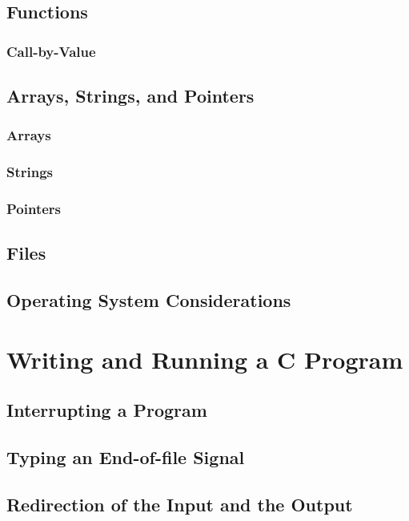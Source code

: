 \documentclass{article}
\begin{document}
\section{Functions} \label{sec:functions}
\subsection{Call-by-Value} \label{sec:call_by_value}
\section{Arrays, Strings, and Pointers} \label{sec:arrays_strings_pointers}
\subsection{Arrays} \label{sec:arrays}
\subsection{Strings} \label{sec:strings}
\subsection{Pointers} \label{sec:pointers}
\section{Files} \label{sec:files}
\section{Operating System Considerations} \label{sec:os_considerations}

\chapter{Writing and Running a C Program}

\section{Interrupting a Program} \label{sec:interrupting_program}
\section{Typing an End-of-file Signal} \label{sec:end_of_file_signal}
\section{Redirection of the Input and the Output} \label{sec:redirection}
\end{document}
